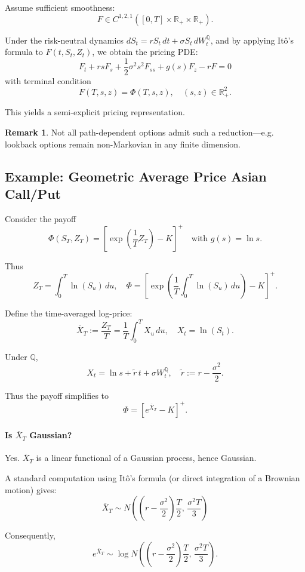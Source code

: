 \documentclass[12pt,a4paper]{article}
\theoremstyle{definition}
\newtheorem{remark}{Remark}[section]
\begin{document}
Assume sufficient smoothness:
\[
F \in C^{1,2,1}([0, T] \times \mathbb{R}_+ \times \mathbb{R}_+).
\]

Under the risk-neutral dynamics $dS_t = r S_t\, dt + \sigma S_t\, dW_t^{\mathbb{Q}}$, and by applying Itô's formula to $F(t, S_t, Z_t)$, we obtain the pricing PDE:
\[
\boxed{
F_t + rs F_s + \frac{1}{2}\sigma^2 s^2 F_{ss} + g(s) F_z - rF = 0
}
\]
with terminal condition
\[
F(T, s, z) = \Phi(T, s, z), \quad (s, z) \in \mathbb{R}_+^2.
\]

This yields a semi-explicit pricing representation.

\begin{remark}
Not all path-dependent options admit such a reduction—e.g. lookback options remain non-Markovian in any finite dimension.
\end{remark}

\subsection{Example: Geometric Average Price Asian Call/Put}

Consider the payoff
\[
\Phi(S_T, Z_T) = \left[\exp\!\left(\frac{1}{T} Z_T\right) - K\right]^+ \quad \text{with } g(s) = \ln s.
\]

Thus
\[
Z_T = \int_0^T \ln(S_u)\, du, \quad \Phi = \left[\exp\!\left(\frac{1}{T} \int_0^T \ln(S_u)\, du\right) - K\right]^+.
\]

Define the time-averaged log-price:
\[
\overline{X}_T := \frac{Z_T}{T} = \frac{1}{T} \int_0^T X_u\, du, \quad X_t = \ln(S_t).
\]

Under $\mathbb{Q}$,
\[
X_t = \ln s + \widetilde{r}\, t + \sigma W_t^{\mathbb{Q}}, \quad \widetilde{r} := r - \frac{\sigma^2}{2}.
\]

Thus the payoff simplifies to
\[
\Phi = [e^{\overline{X}_T} - K]^+.
\]

\paragraph{Is $\overline{X}_T$ Gaussian?}

Yes. $\overline{X}_T$ is a linear functional of a Gaussian process, hence Gaussian.

A standard computation using Itô's formula (or direct integration of a Brownian motion) gives:
\[
\overline{X}_T \sim N\!\left(\left(r - \frac{\sigma^2}{2}\right)\frac{T}{2},\, \frac{\sigma^2 T}{3}\right)
\]

Consequently,
\[
e^{\overline{X}_T} \sim \log N\!\left(\left(r - \frac{\sigma^2}{2}\right)\frac{T}{2},\, \frac{\sigma^2 T}{3}\right).
\]
\end{document}

